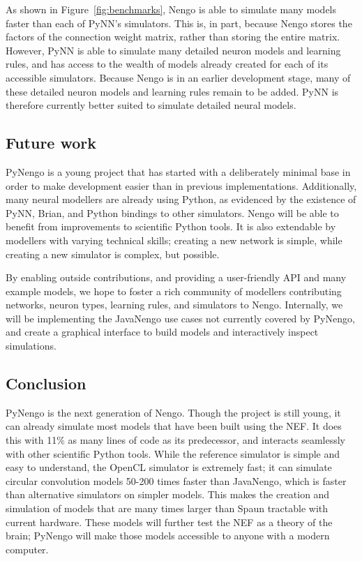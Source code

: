 \documentclass{frontiersSCNS}
\begin{document}
As shown in Figure~\ref{fig:benchmarks},
Nengo is able to simulate many models
faster than each of PyNN's simulators.
This is, in part,
because Nengo stores the factors
of the connection weight matrix,
rather than storing the entire matrix.
However, PyNN is able to simulate
many detailed neuron models
and learning rules,
and has access to the wealth of models
already created for each of its
accessible simulators.
Because Nengo is in an earlier development stage,
many of these detailed neuron models
and learning rules remain to be added.
PyNN is therefore currently better suited to
simulate detailed neural models.

\subsection{Future work}

PyNengo is a young project that
has started with a deliberately minimal base
in order to make development easier than in
previous implementations.
Additionally, many neural modellers
are already using Python,
as evidenced by the existence of
PyNN, Brian, and Python bindings to other simulators.
Nengo will be able to benefit
from improvements to scientific Python tools.
It is also extendable by modellers with
varying technical skills;
creating a new network is simple,
while creating a new simulator is complex, but possible.

By enabling outside contributions,
and providing a user-friendly API
and many example models,
we hope to foster a rich community of modellers
contributing networks, neuron types, learning rules,
and simulators to Nengo.
Internally, we will be
implementing the JavaNengo use cases
not currently covered by PyNengo,
and create a graphical interface
to build models and
interactively inspect simulations.

\subsection{Conclusion}

PyNengo is the next generation of Nengo.
Though the project is still young,
it can already simulate most models
that have been built using the NEF.
It does this with 11\% as many lines of code
as its predecessor,
and interacts seamlessly with
other scientific Python tools.
While the reference simulator
is simple and easy to understand,
the OpenCL simulator is extremely fast;
it can simulate circular convolution models
50-200 times faster than JavaNengo,
which is faster than alternative simulators
on simpler models.
This makes the creation and simulation
of models that are many times larger than Spaun
tractable with current hardware.
These models will further test
the NEF as a theory of the brain;
PyNengo will make those models
accessible to anyone with a modern computer.
\end{document}
